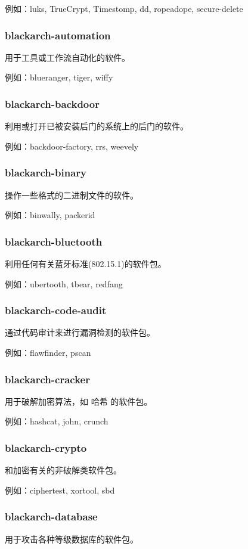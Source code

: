 \documentclass[a4paper, oneside, 11pt]{book}
\begin{document}
例如：luks, TrueCrypt, Timestomp, dd, ropeadope, secure-delete

\subsubsection{blackarch-automation}
用于工具或工作流自动化的软件。

例如：blueranger, tiger, wiffy

\subsubsection{blackarch-backdoor}
利用或打开已被安装后门的系统上的后门的软件。

例如：backdoor-factory, rrs, weevely

\subsubsection{blackarch-binary}
操作一些格式的二进制文件的软件。

例如：binwally, packerid

\subsubsection{blackarch-bluetooth}
利用任何有关蓝牙标准(802.15.1)的软件包。

例如：ubertooth, tbear, redfang

\subsubsection{blackarch-code-audit}
通过代码审计来进行漏洞检测的软件包。

例如：flawfinder, pscan

\subsubsection{blackarch-cracker}
用于破解加密算法，如 哈希 的软件包。

例如：hashcat, john, crunch

\subsubsection{blackarch-crypto}
和加密有关的非破解类软件包。

例如：ciphertest, xortool, sbd

\subsubsection{blackarch-database}
用于攻击各种等级数据库的软件包。
\end{document}
